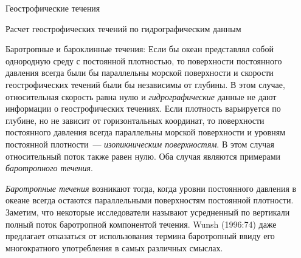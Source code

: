 \begin{chapter}{Геострофические течения}
\begin{section}{Расчет геострофических течений по гидрографическим данным}
\begin{paragraph}{Баротропные и бароклинные течения:}
Если бы океан представлял собой однородную среду с постоянной
плотностью, то поверхности постоянного давления всегда были бы
параллельны морской поверхности и скорости геострофических течений
были бы независимы от глубины. В этом случае, относительная скорость
равна нулю и \emph{гидрографические} данные не дают информации о
геострофических течениях. Если плотность варьируется по глубине, но не
зависит от горизонтальных координат, то поверхности постоянного
давления всегда параллельны морской поверхности и уровням постоянной
плотности~--- \emph{изопикническим поверхностям}. В этом случая
относительный поток также равен нулю. Оба случая являются примерами
\emph{баротропного течения}.
%

\emph{Баротропные течения} возникают тогда, когда уровни постоянного
давления в океане всегда остаются параллельными поверхностям
постоянной плотности. Заметим, что некоторые исследователи называют
усредненный по вертикали полный поток баротропной компонентой
течения. Wunsh (1996:74) даже предлагает отказаться от использования
термина баротропный ввиду его многократного употребления в самых
различных смыслах.
%


\end{paragraph}
\end{section}
\end{chapter}
